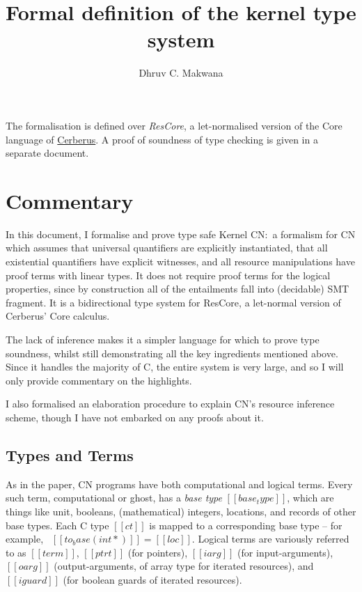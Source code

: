 \documentclass[11pt]{article}%
\title{\vspace{-2cm} Formal definition of the kernel type system}
\author{Dhruv C. Makwana}
\date{}
\begin{document}

\maketitle%


\noindent
The formalisation is defined
over \emph{ResCore}, a let-normalised version of the Core language of
\href{https://github.com/rems-project/cerberus}{Cerberus}. A proof of soundness
of type checking is given in a separate document.

{\let\clearpage\relax \tableofcontents}

\section{Commentary}\label{sec:commentary}

In this document, I formalise and prove type safe Kernel CN:\ a formalism for
CN which assumes that universal quantifiers are explicitly instantiated, that
all existential quantifiers have explicit witnesses, and all resource
manipulations have proof terms with linear types. It does not require proof
terms for the logical properties, since by construction all of the entailments
fall into (decidable) SMT fragment. It is a bidirectional type system for
ResCore, a let-normal version of Cerberus' Core calculus.

The lack of inference makes it a simpler language for which to prove type
soundness, whilst still demonstrating all the key ingredients mentioned above.
Since it handles the majority of C, the entire system is very large, and so I
will only provide commentary on the highlights.

I also formalised an elaboration procedure to explain CN's resource
inference scheme, though I have not embarked on any proofs about it.

\subsection{Types and Terms}

As in the paper, CN programs have both computational and logical terms.
Every such term, computational or ghost, has a \emph{base type} $[[ base_type ]]$,
which are things like unit, booleans, (mathematical) integers, locations,
and records of other base types. Each C type $[[ ct ]]$ is mapped to a
corresponding base type -- for example, \ $[[ to_base ( int * ) ]] = [[ loc ]]$.
Logical terms are variously referred to as $[[ term ]]$, $[[ ptrt ]]$
(for pointers), $[[ iarg ]]$ (for
input-arguments), $[[ oarg ]]$ (output-arguments, of array type for
iterated resources), and $[[ iguard ]]$ (for boolean guards of iterated resources).
\end{document}
